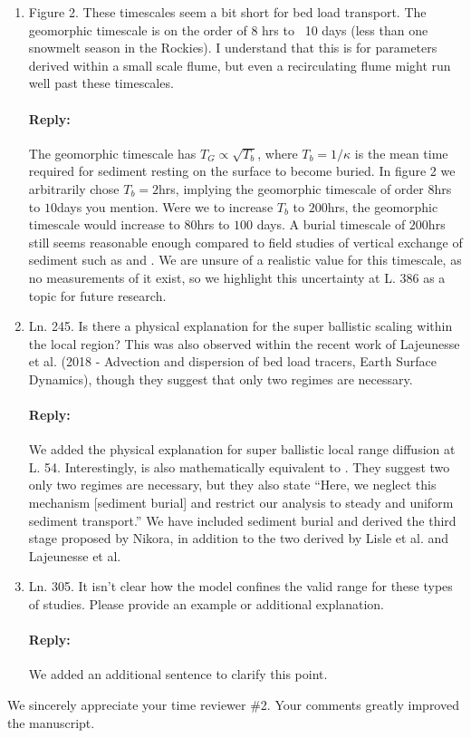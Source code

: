 \documentclass[11pt]{article}
\begin{document}
\begin{enumerate}
\item 
Figure 2. These timescales seem a bit short for bed load transport. The geomorphic timescale is on the order of 8 hrs to ~10 days (less than one snowmelt season in the Rockies). I understand that this is for parameters derived within a small scale flume, but even a recirculating flume might run well past these timescales.

\paragraph{Reply:}
The geomorphic timescale has $T_G \propto \sqrt{T_b}$, where $T_b = 1/\kappa$ is the mean time required for sediment resting on the surface to become buried. In figure 2 we arbitrarily chose $T_b = 2$hrs, implying the geomorphic timescale of order $8$hrs to $10$days you mention. Were we to increase $T_b$ to $200$hrs, the geomorphic timescale would increase to $80$hrs to $100$ days. A burial timescale of $200$hrs still seems reasonable enough compared to field studies of vertical exchange of sediment such as \citet{Ferguson2002} and \citet{Haschenburger2011}. We are unsure of a realistic value for this timescale, as no measurements of it exist, so we highlight this uncertainty at L. 386 as a topic for future research. 

\item 
Ln. 245. Is there a physical explanation for the super ballistic scaling within the local region? This was also observed within the recent work of Lajeunesse et al. (2018 - Advection and dispersion of bed load tracers, Earth Surface Dynamics), though they suggest that only two regimes are necessary.

\paragraph{Reply:}
We added the physical explanation for super ballistic local range diffusion at L. 54. Interestingly, \citet{Lajeunesse2018} is also mathematically equivalent to \citet{Lisle1998}. They suggest two only two regimes are necessary, but they also state ``Here, we neglect this mechanism [sediment burial] and restrict our analysis to steady and uniform sediment transport.'' We have included sediment burial and derived the third stage proposed by Nikora, in addition to the two derived by Lisle et al. and Lajeunesse et al. 

\item 
Ln. 305. It isn't clear how the model confines the valid range for these types of studies. Please provide an example or additional explanation.

\paragraph{Reply:}
We added an additional sentence to clarify this point. 
\end{enumerate}
We sincerely appreciate your time reviewer \#2. Your comments greatly improved the manuscript.



\end{document}
